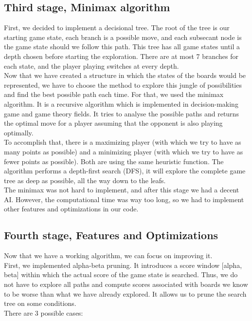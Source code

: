 \documentclass[12pt, a4paper, oneside]{report}
\begin{document}
	\subsection{Third stage, Minimax algorithm}

	First, we decided to implement a decisional tree. The root of the tree is our starting game state, each branch is a possible move, and each subsecant node is the game state should we follow this path. This tree has all game states until a depth chosen before starting the exploration. There are at most 7 branches for each state, and the player playing switches at every depth. \\

	Now that we have created a structure in which the states of the boards would be represented, we have to choose the method to explore this jungle of possibilities and find the best possible path each time. For that, we used the minimax algorithm. It is a recursive algorithm which is implemented in decision-making game and game theory fields. It tries to analyse the possible paths and returns the optimal move for a player assuming that the opponent is also playing optimally. \\

	To accomplish that, there is a maximizing player (with which we try to have as many points as possible) and a minimizing player (with which we try to have as fewer points as possible). Both are using the same heuristic function. The algorithm performs a depth-first search (DFS), it will explore the complete game tree as deep as possible, all the way down to the leafs. \\
	The minimax was not hard to implement, and after this stage we had a decent AI. However, the computational time was way too long, so we had to implement other features and optimizations in our code. \\

	\subsection{Fourth stage, Features and Optimizations}
	Now that we have a working algorithm, we can focus on improving it. \\

	First, we implemented alpha-beta pruning. It introduces a score window [alpha, beta] within which the actual score of the game state is searched. Thus, we do not have to explore all paths and compute scores associated with boards we know to be worse than what we have already explored. It allows us to prune the search tree on some conditions. \\
	There are 3 possible cases:
\end{document}
